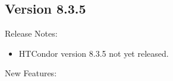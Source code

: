\subsection*{\label{sec:New-8-3-5}Version 8.3.5}

\noindent Release Notes:

\begin{itemize}

\item HTCondor version 8.3.5 not yet released.

\end{itemize}


\noindent New Features:

